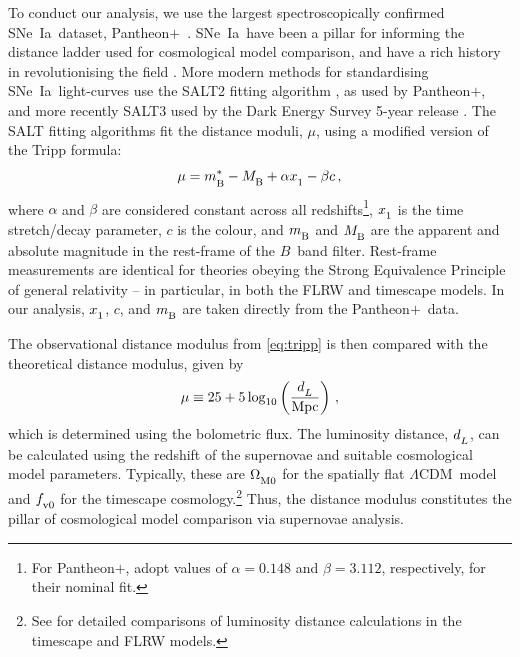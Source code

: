 \documentclass[fleqn,usenatbib]{mnras}
\newcommand{\pplus}{Pantheon$+$}
\newcommand{\LA}{\Lambda}
\newcommand{\lcdm}{spatially flat $\LA$CDM}
\newcommand{\sne}{SNe~Ia}
\newcommand{\Z}[1]{_{\lower2pt\hbox{$\scriptstyle#1$}}}
\newcommand{\Ns}[1]{_{\lower2pt\hbox{$\scriptstyle\rm#1$}}}
\newcommand{\dL}{d\Z{L}}
\begin{document}
To conduct our analysis, we use the largest spectroscopically confirmed \sne\ dataset, \pplus\ \citep{Scolnic_2022}. \sne\ have been a pillar for informing the distance ladder used for cosmological model comparison, and have a rich history in revolutionising the field \citep{Riess_1998, Perlmutter_1999}. More modern methods for standardising \sne\ light-curves use the SALT2 fitting algorithm \citep{Guy_2007, Taylor_2021}, as used by \pplus, and more recently SALT3 \citep{Kenworthy_2021} used by the Dark Energy Survey 5-year release \citep[DES5yr,][]{DES_2024}. The SALT fitting algorithms fit the distance moduli, $\mu$, using a modified version%
of the Tripp formula:
\begin{equation}\label{eq:tripp}
    \mu = m\Ns{B}^* - M\Ns{B} + \alpha x\Z 1 - \beta c\,,
\end{equation}
where $\alpha$ and $\beta$ are considered constant across all redshifts\footnote{For \pplus, \citet{Scolnic_2022} adopt values of $\alpha = 0.148$ and $\beta = 3.112$, respectively, for their nominal fit.}, $x\Z 1$ is the time stretch/decay parameter, $c$ is the colour, and $m\Ns{B}$ and $M\Ns{B}$ are the apparent and absolute magnitude in the rest-frame of the $B$~band filter. Rest-frame measurements are identical for theories obeying the Strong Equivalence Principle of general relativity -- in particular, in both the FLRW and timescape models. In our analysis, $x\Z 1$, $c$, and $m\Ns{B}$ are taken directly from the \pplus\ data.

The observational distance modulus from \cref{eq:tripp} is then compared with the theoretical distance modulus, given by
\begin{equation}
    \mu \equiv 25 + 5 \log_{10}\left(\frac{\dL}{\rm Mpc}\right)\label{eq:mu}\,,
\end{equation}
which is determined using the bolometric flux. The luminosity distance, $\dL$, can be calculated using the redshift of the supernovae and suitable cosmological model parameters. Typically, these are $\Omega\Ns{M0}$ for the \lcdm\ model and $f\Ns{v0}$ for the timescape cosmology.\footnote{See \citet[Appendix~A]{Dam_2017} for detailed comparisons of luminosity distance calculations in the timescape and FLRW models.} Thus, the distance modulus constitutes the pillar of cosmological model comparison via supernovae analysis.
\end{document}
